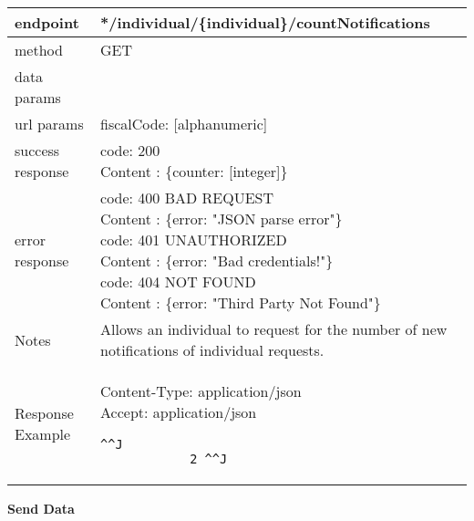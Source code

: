 	\begin{tabularx}{\linewidth}{| l| l }
		\hline
		endpoint & */individual/\{individual\}/countNotifications \\
		\hline
		method & GET \\
		\hline
		data params & \\
		\hline
		url params &
		\parbox{0.7\textwidth}{
			\bigskip
			fiscalCode: [alphanumeric]
			\bigskip
		} \\
		\hline
		success response &
		\parbox{0.7\textwidth}{
			\bigskip
			code: 200\\
			Content : \{counter: [integer]\}
			\bigskip
		} \\
		\hline
		error response &
		\parbox{0.7\textwidth}{
			\bigskip
			code: 400 BAD REQUEST \\
			Content : \{error: "JSON parse error"\}\\
			code: 401 UNAUTHORIZED \\
			Content : \{error: "Bad credentials!"\}\\
			code: 404 NOT FOUND \\
			Content : \{error: "Third Party Not Found"\}
			\bigskip
		} \\
		\hline
		Notes & 
		\parbox{0.7\textwidth}{
			\bigskip Allows an individual to request for the number of new notifications of individual requests.
		\bigskip}  \\
		\hline
		Response Example & 
		\parbox{0.8\textwidth}{
		\bigskip
		Content-Type: application/json \\
		Accept: application/json \\
		\begin{lstlisting}^^J
			2 ^^J
		\end{lstlisting}
	} \\
	\hline
	\end{tabularx}
	
	\textbf{Send Data} \\

